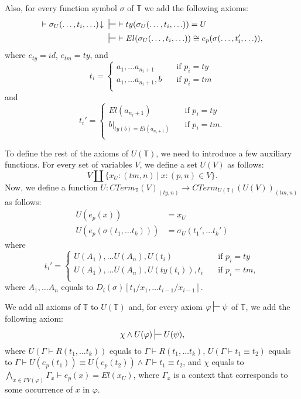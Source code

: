 \documentclass[reqno]{amsart}
\theoremstyle{definition}
\theoremstyle{remark}
\newcommand{\deq}{\equiv}
\numberwithin{figure}{section}
\begin{document}
\begin{example}
Also, for every function symbol $\sigma$ of $\mathbb{T}$ we add the following axioms:
\begin{align*}
\vdash \sigma_U(\ldots, t_i, \ldots)\!\downarrow\ & \sststile{}{}\ \vdash ty(\sigma_U(\ldots, t_i, \ldots)) = U \\
& \sststile{}{}\ \vdash El(\sigma_U(\ldots, t_i, \ldots)) \cong e_p(\sigma(\ldots, t_i', \ldots)),
\end{align*}
where $e_{ty} = id$, $e_{tm} = ty$, and
\[ t_i =
  \begin{cases}
    a_1, \ldots a_{n_i+1}       & \quad \text{if } p_i = ty \\
    a_1, \ldots a_{n_i+1}, b    & \quad \text{if } p_i = tm \\
  \end{cases}
\]
and
\[ t_i' =
  \begin{cases}
    El(a_{n_i+1})               & \quad \text{if } p_i = ty \\
    b|_{ty(b) = El(a_{n_i+1})}  & \quad \text{if } p_i = tm. \\
  \end{cases}
\]

To define the rest of the axioms of $U(\mathbb{T})$, we need to introduce a few auxiliary functions.
For every set of variables $V$, we define a set $U(V)$ as follows:
\[ V \amalg \{ x_U : (tm,n)\ |\ x : (p,n) \in V \}. \]
Now, we define a function $U : CTerm_\mathbb{T}(V)_{(ty,n)} \to CTerm_{U(\mathbb{T})}(U(V))_{(tm,n)}$ as follows:
\begin{align*}
U(e_p(x)) & = x_U \\
U(e_p(\sigma(t_1, \ldots t_k))) & = \sigma_U(t_1', \ldots t_k')
\end{align*}
where
\[ t_i' =
  \begin{cases}
    U(A_1), \ldots U(A_n), U(t_i)           & \quad \text{if } p_i = ty \\
    U(A_1), \ldots U(A_n), U(ty(t_i)), t_i  & \quad \text{if } p_i = tm, \\
  \end{cases}
\]
where $A_1, \ldots A_n$ equals to $D_i(\sigma)[t_1/x_1, \ldots t_{i-1}/x_{i-1}]$.

We add all axioms of $\mathbb{T}$ to $U(\mathbb{T})$ and, for every axiom $\varphi \sststile{}{} \psi$ of $\mathbb{T}$, we add the following axiom:
\[ \chi \land U(\varphi) \sststile{}{} U(\psi), \]
where $U(\Gamma \vdash R(t_1, \ldots t_k))$ equals to $\Gamma \vdash R(t_1, \ldots t_k)$,
$U(\Gamma \vdash t_1 \deq t_2)$ equals to $\Gamma \vdash U(e_p(t_1)) \deq U(e_p(t_2)) \land \Gamma \vdash t_1 \deq t_2$,
and $\chi$ equals to $\bigwedge_{x \in FV(\varphi)} \Gamma_x \vdash e_p(x) = El(x_U)$, where $\Gamma_x$ is a context that corresponds to some occurrence of $x$ in $\varphi$.


\end{example}
\end{document}
